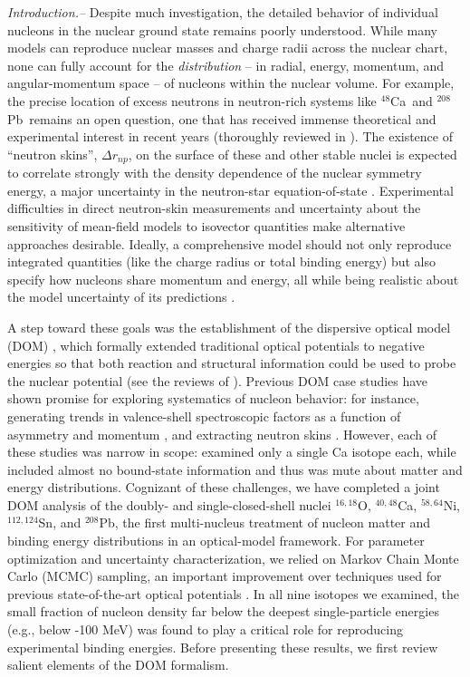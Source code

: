 \documentclass[twocolumn,secnumarabic,amssymb, nobibnotes, aps, prl, superscriptaddress, nobalancelastpage]{revtex4-1}
\newcommand{\oSixEight}{\ensuremath{^{16,18}}O}
\newcommand{\caEight}{\ensuremath{^{48}}C\lowercase{a}}
\newcommand{\caAughtEight}{\ensuremath{^{40,48}}C\lowercase{a}}
\newcommand{\niEightFour}{\ensuremath{^{58,64}}N\lowercase{i}}
\newcommand{\snTwelveFour}{\ensuremath{^{112,124}}S\lowercase{n}}
\newcommand{\pbEight}{\ensuremath{^{208}}P\lowercase{b}}
\begin{document}
\textit{Introduction.--}
Despite much investigation, the detailed behavior of individual nucleons in
the nuclear ground state remains poorly understood. While many models can 
reproduce nuclear masses and charge radii across the nuclear chart, none
can fully account for the \textit{distribution} -- in radial,
energy, momentum, and angular-momentum space -- of nucleons within the nuclear volume.
For example, the precise location of excess neutrons in neutron-rich systems like \caEight\ and
\pbEight\ remains an open question, one that has received immense theoretical and experimental interest in
recent years (thoroughly reviewed in \cite{Thiel2019}). The existence of ``neutron skins'', $\Delta r_{np}$, on the surface of these
and other stable nuclei is expected to correlate strongly with the density dependence of the
nuclear symmetry energy, a major uncertainty in the neutron-star equation-of-state
\cite{Fattoyev2012, Piekarewicz2012, Vinas2014}. Experimental
difficulties in direct neutron-skin measurements and uncertainty about the sensitivity of mean-field
models to isovector quantities \cite{Furnstahl2002} make alternative
approaches desirable. Ideally, a comprehensive model should not only reproduce
integrated quantities (like the charge radius or total binding energy)
but also specify how nucleons share momentum and energy, all
while being realistic about the model uncertainty of its predictions
\cite{UncertaintyEditorial}.

A step toward these goals was the establishment of the
dispersive optical model (DOM) \cite{Mahaux1991}, which formally extended
traditional optical potentials to negative energies so that both reaction and
structural information could be used to probe the nuclear
potential (see the reviews of \cite{Dickhoff2017, Dickhoff2019}). Previous DOM case studies
have shown promise for exploring systematics of nucleon behavior:
for instance, generating trends in valence-shell spectroscopic factors as a function of asymmetry
\cite{Mueller2011, Atkinson2019} and momentum \cite{Atkinson2018}, and extracting neutron
skins \cite{Mahzoon2014, Mahzoon2017, Atkinson2020}.
However, each of these studies was narrow in scope: \cite{Mahzoon2014,
Mahzoon2017, Atkinson2018} examined only a single Ca isotope each, while 
\cite{Mueller2011} included almost no bound-state information and thus
was mute about matter and energy distributions.
Cognizant of these challenges, we have completed a joint DOM analysis of the doubly-
and single-closed-shell nuclei \oSixEight, \caAughtEight,
\niEightFour, \snTwelveFour, and \pbEight, the
first multi-nucleus treatment of nucleon matter and binding energy distributions
in an optical-model framework. For parameter optimization and uncertainty characterization,
we relied on Markov Chain Monte Carlo (MCMC) sampling, an important improvement over techniques used
for previous state-of-the-art optical potentials \cite{CH89,KoningDelaroche}.
In all nine isotopes we examined, the small fraction of
nucleon density far below the deepest single-particle
energies (e.g., below -100 MeV) was found to play a critical role for reproducing experimental
binding energies. Before presenting these results, we first review salient elements of the DOM
formalism.
\end{document}
